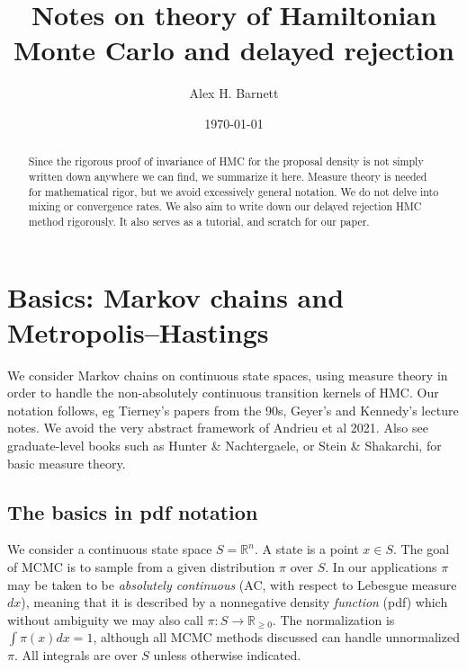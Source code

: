 \documentclass[10pt]{article}
\newcommand{\R}{\mathbb{R}}
\begin{document}
\title{Notes on theory of Hamiltonian Monte Carlo and delayed rejection}


\author{Alex H. Barnett}
\date{\today}
\maketitle

\begin{abstract}
  Since the rigorous proof of invariance of HMC for the proposal density
  is not simply written
  down anywhere we can find, we summarize it here.
  Measure theory is needed for mathematical rigor, but we avoid
  excessively general notation.
  We do not delve into mixing or convergence rates.
  We also aim to write down our delayed rejection HMC method rigorously.
  It also serves as a tutorial,
  and scratch for our paper.
\end{abstract}



\section{Basics: Markov chains and Metropolis--Hastings}

We consider Markov chains on continuous
state spaces, using measure theory in order to handle the non-absolutely
continuous transition kernels of HMC.
Our notation follows, eg Tierney's papers from the 90s, Geyer's and Kennedy's lecture notes.
We avoid the very abstract framework of Andrieu et al 2021.
Also see graduate-level books such as Hunter \& Nachtergaele, or Stein \& Shakarchi, for basic measure theory.

\subsection{The basics in pdf notation}

We consider a continuous state space $S = \R^n$.
A state is a point $x\in S$.
The goal of MCMC is to sample from a given distribution $\pi$ over $S$.
In our applications $\pi$ may be taken to be
{\em absolutely continuous} (AC, with respect to
Lebesgue measure $dx$), meaning that it is described by a nonnegative
density {\em function} (pdf) which without ambiguity we may also call
$\pi: S \to \R_{\ge 0}$.
The normalization is $\int \pi(x) dx = 1$, although all MCMC methods
discussed can handle unnormalized $\pi$.
All integrals are over $S$ unless otherwise indicated.
\end{document}
